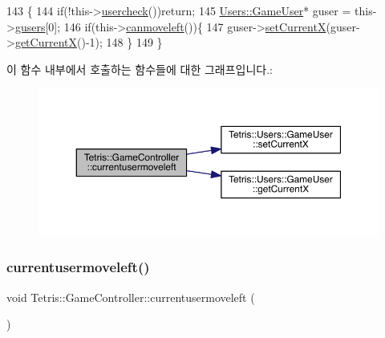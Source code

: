 \begin{DoxyCode}
143                                             \{
144                 \textcolor{keywordflow}{if}(!this->\hyperlink{class_tetris_1_1_game_controller_ab96e22daad51119b35cbee8cfb7385ef}{usercheck}())\textcolor{keywordflow}{return};
145                 \hyperlink{class_tetris_1_1_users_1_1_game_user}{Users::GameUser}* guser = this->\hyperlink{class_tetris_1_1_game_controller_a1a31d3a933daad6d95e20458eea2900e}{gusers}[0];
146                 \textcolor{keywordflow}{if}(this->\hyperlink{class_tetris_1_1_game_controller_ae541cf926ccdce47a185c94a0c80b642}{canmoveleft}())\{
147                     guser->\hyperlink{class_tetris_1_1_users_1_1_game_user_a2957358b1a6298f06c6c2e10cb89f623}{setCurrentX}(guser->\hyperlink{class_tetris_1_1_users_1_1_game_user_ad25eace96bd27ae6df4a0c0d506be730}{getCurrentX}()-1);
148                 \}
149             \}
\end{DoxyCode}
이 함수 내부에서 호출하는 함수들에 대한 그래프입니다.\+:
\nopagebreak
\begin{figure}[H]
\begin{center}
\leavevmode
\includegraphics[width=350pt]{db/dd2/class_tetris_1_1_game_controller_ac0d40a0936505754131099034b4271fa_cgraph}
\end{center}
\end{figure}
\mbox{\label{class_tetris_1_1_game_controller_ac0d40a0936505754131099034b4271fa}} 
\subsubsection{\texorpdfstring{currentusermoveleft()}{currentusermoveleft()}\hspace{0.1cm}{\footnotesize\ttfamily [2/2]}}
{\footnotesize\ttfamily void Tetris\+::\+Game\+Controller\+::currentusermoveleft (\begin{DoxyParamCaption}{ }\end{DoxyParamCaption})\hspace{0.3cm}{\ttfamily [inline]}}



